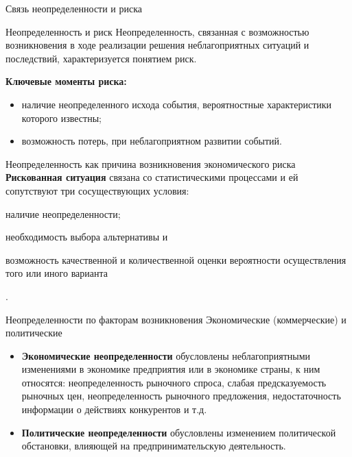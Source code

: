 \documentclass[_fin_decisions_lectures.tex]{subfiles}
\begin{document}
\begin{frame}{Связь неопределенности и риска}
\begin{block}{Неопределенность и риск}
Неопределенность, связанная с возможностью возникновения в ходе реализации решения неблагоприятных ситуаций и последствий, характеризуется понятием риск.
\end{block}
\textbf{Ключевые моменты риска:}
\begin{itemize}
\item
 наличие неопределенного исхода события, вероятностные характеристики которого известны;
 \item
 возможность потерь, при неблагоприятном развитии событий.
\end{itemize}
\end{frame}

\begin{frame}{Неопределенность как причина возникновения экономического риска}
\textbf{Рискованная ситуация} связана со статистическими процессами и ей сопутствуют три сосуществующих условия: \begin{inparaenum}
\item наличие неопределенности; \item необходимость выбора альтернативы и \item возможность качественной и количественной оценки вероятности осуществления того или иного варианта\end{inparaenum}.

\end{frame}

\begin{frame}[allowframebreaks]{Неопределенности по факторам возникновения }{Экономические (коммерческие) и политические}
\begin{itemize}
\item
\textbf{Экономические неопределенности }обусловлены неблагоприятными изменениями в экономике предприятия или в экономике страны, к ним относятся: неопределенность рыночного спроса, слабая предсказуемость рыночных цен, неопределенность рыночного предложения, недостаточность информации о действиях конкурентов и т.д. 
\pagebreak
\item
\textbf{Политические неопределенности }обусловлены изменением политической обстановки, влияющей на предпринимательскую деятельность. 

\end{itemize}
\end{frame}
\end{document}
